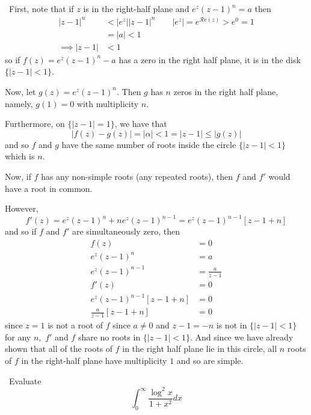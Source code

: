 \documentclass[12pt]{Homework}
\newcommand{\re}{\mathscr{R}\text{e}}
\begin{document}
\begin{solution}$\,$
First, note that if $z$ is in the right-half plane and $e^z(z-1)^n=a$ then \begin{align*}
    |z-1|^n&<|e^z||z-1|^n\qquad |e^z|=e^{\re(z)}>e^0=1\\
    &=|a|<1\\
    \implies |z-1|&<1
\end{align*} so if $f(z)=e^z(z-1)^n-a$ has a zero in the right half plane, it is in the disk $\{|z-1|<1\}$. 

Now, let $g(z)=e^z(z-1)^n$. Then $g$ has $n$ zeros in the right half plane, namely, $g(1)=0$ with multiplicity $n$.

Furthermore, on $\{|z-1|=1\}$, we have that $$|f(z)-g(z)|=|\alpha|<1=|z-1|\le|g(z)|$$ and so $f$ and $g$ have the same number of roots inside the circle $\{|z-1|<1\}$ which is $n.$

Now, if $f$ has any non-simple roots (any repeated roots), then $f$ and $f'$ would have a root in common. 

However, $$f'(z)=e^z(z-1)^n+ne^z(z-1)^{n-1}=e^z(z-1)^{n-1}[z-1+n]$$ and so if $f$ and $f'$ are simultaneously zero, then \begin{align*}
    f(z)&=0\\
    e^z(z-1)^n&=a\\
    e^z(z-1)^{n-1}&=\frac{a}{z-1}\\
    f'(z)&=0\\
    e^z(z-1)^{n-1}[z-1+n]&=0\\
    \frac{a}{z-1}[z-1+n]&=0
\end{align*} since $z=1$ is not a root of $f$ since $a\not=0$ and $z-1=-n$ is not in $\{|z-1|<1\}$ for any $n,$ $f'$ and $f$ share no roots in $\{|z-1|<1\}$. And since we have already shown that all of the roots of $f$ in the right half plane lie in this circle, all $n$ roots of $f$ in the right-half plane have multiplicity $1$ and so are simple.
\end{solution}
\newpage




\begin{problem} $\,$
Evaluate $$\int_0^\infty\frac{\log^2x}{1+x^2}dx$$
\end{problem}
\end{document}

